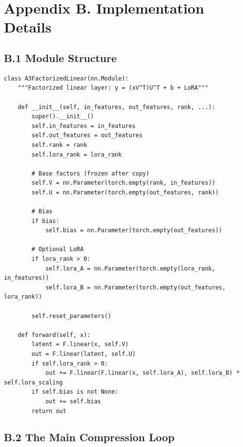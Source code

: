 
\section{Appendix B. Implementation Details}

\subsection{B.1 Module Structure}

\begin{lstlisting}
class A3FactorizedLinear(nn.Module):
    """Factorized linear layer: y = (xV^T)U^T + b + LoRA"""
    
    def __init__(self, in_features, out_features, rank, ...):
        super().__init__()
        self.in_features = in_features
        self.out_features = out_features
        self.rank = rank
        self.lora_rank = lora_rank
        
        # Base factors (frozen after copy)
        self.V = nn.Parameter(torch.empty(rank, in_features))
        self.U = nn.Parameter(torch.empty(out_features, rank))
        
        # Bias
        if bias:
            self.bias = nn.Parameter(torch.empty(out_features))
        
        # Optional LoRA
        if lora_rank > 0:
            self.lora_A = nn.Parameter(torch.empty(lora_rank, in_features))
            self.lora_B = nn.Parameter(torch.empty(out_features, lora_rank))
        
        self.reset_parameters()
    
    def forward(self, x):
        latent = F.linear(x, self.V)
        out = F.linear(latent, self.U)
        if self.lora_rank > 0:
            out += F.linear(F.linear(x, self.lora_A), self.lora_B) * self.lora_scaling
        if self.bias is not None:
            out += self.bias
        return out
\end{lstlisting}

\subsection{B.2 The Main Compression Loop}

